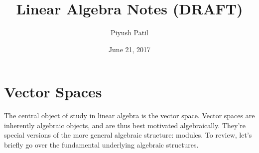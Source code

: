 \documentclass{article}
\begin{document}
\title{Linear Algebra Notes (DRAFT)}
\author{Piyush Patil}
\date{June 21, 2017}
\maketitle


\section{Vector Spaces}

The central object of study in linear algebra is the vector space. Vector spaces are inherently algebraic objects, and are thus best motivated algebraically. They're special versions of the more general algebraic structure: modules. To review, let's briefly go over the fundamental underlying algebraic structures.
\end{document}
